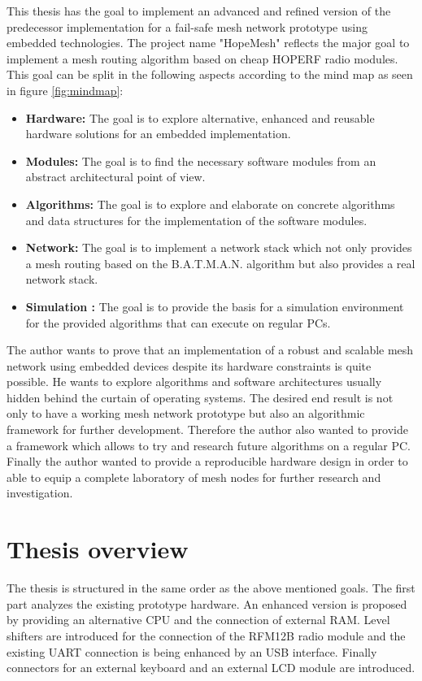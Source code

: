 This thesis has the goal to implement an advanced and refined version of the predecessor implementation \cite{korniowski} for a fail-safe mesh network prototype using embedded technologies. The project name "HopeMesh" reflects the major goal to implement a mesh routing algorithm based on cheap HOPERF radio modules. This goal can be split in the following aspects according to the mind map as seen in figure \ref{fig:mindmap}:
\begin{itemize}
    \item \textbf{Hardware: } The goal is to explore alternative, enhanced and reusable hardware solutions for an embedded implementation.
    \item \textbf{Modules:} The goal is to find the necessary software modules from an abstract architectural point of view.
    \item \textbf{Algorithms:} The goal is to explore and elaborate on concrete algorithms and data structures for the implementation of the software modules.
    \item \textbf{Network:} The goal is to implement a network stack which not only provides a mesh routing based on the B.A.T.M.A.N. algorithm but also provides a real network stack.
    \item \textbf{Simulation :} The goal is to provide the basis for a simulation environment for the provided algorithms that can execute on regular PCs.
\end{itemize}

The author wants to prove that an implementation of a robust and scalable mesh network using embedded devices despite its hardware constraints is quite possible. He wants to explore algorithms and software architectures usually hidden behind the curtain of operating systems.
The desired end result is not only to have a working mesh network prototype but also an algorithmic framework for further development. Therefore the author also wanted to provide a framework which allows to try and research future algorithms on a regular PC.
Finally the author wanted to provide a reproducible hardware design in order to able to equip a complete laboratory of mesh nodes for further research and investigation.

\section{Thesis overview}%
The thesis is structured in the same order as the above mentioned goals. The first part analyzes the existing prototype hardware. An enhanced version is proposed by providing an alternative CPU and the connection of external RAM. Level shifters are introduced for the connection of the RFM12B radio module and the existing UART connection is being enhanced by an USB interface. Finally connectors for an external keyboard and an external LCD module are introduced.

